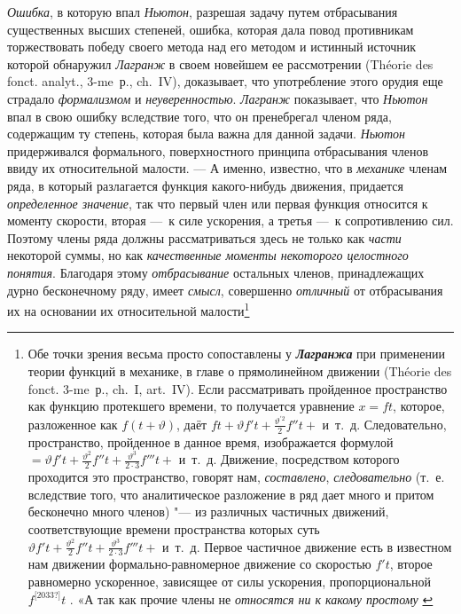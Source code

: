{{\em Ошибка}, в которую впал
{\em Ньютон}, разрешая задачу путем отбрасывания
существенных высших степеней, ошибка, которая дала повод противникам
торжествовать победу своего метода над его методом и истинный источник
которой обнаружил {\em Лагранж} в своем новейшем ее рассмотрении
(Théorie des fonct. analyt., 3-me~р., ch.~IV),
доказывает, что употребление этого орудия еще страдало
{\em формализмом} и {\em неуверенностью}. {\em Лагранж}
показывает, что {\em Ньютон} впал в свою ошибку
вследствие того, что он пренебрегал членом ряда, содержащим ту степень,
которая была важна для данной задачи. {\em Ньютон}
придерживался формального, поверхностного принципа отбрасывания членов
ввиду их относительной малости. — А именно, известно, что в
{\em механике} членам ряда, в который разлагается
функция какого-нибудь движения, придается
{\em определенное значение}, так что первый член или
первая функция относится к моменту скорости, вторая —~к силе ускорения, а
третья —~к сопротивлению сил. Поэтому члены ряда должны рассматриваться
здесь не только как {\em части} некоторой суммы, но как
{\em качественные моменты некоторого целостного
понятия}. Благодаря этому {\em отбрасывание} остальных
членов, принадлежащих дурно бесконечному ряду, имеет
{\em смысл}, совершенно
{\em отличный} от отбрасывания их на основании их
относительной малости\footnote{
Обе точки зрения весьма просто
сопоставлены у {\em\bfseries Лагранжа} при
применении теории функций в механике, в главе о прямолинейном движении
(Théorie des fonct. 3-me~р., ch.~I, art.~IV). Если
рассматривать пройденное пространство как функцию протекшего времени, то
получается уравнение $x=\mathit{ft}$, которое, разложенное
как $f(t+\vartheta )$, даёт
$\mathit{ft} + \vartheta f't + \frac{\vartheta ^{'2}} 2 f''t + $
и~т.~д. Следовательно, пространство, пройденное в данное время,
изображается формулой
$ = \vartheta f't+\frac{\vartheta ^2}
2 f''t + \frac{\vartheta ^3}{2 \cdot 3} f'''t + $
и~т.~д. Движение, посредством которого проходится это
пространство, говорят нам, {\em составлено}, {\em следовательно} (т.~е.
вследствие того, что аналитическое разложение в ряд дает много и притом
бесконечно много членов) "--- из различных частичных движений,
соответствующие времени пространства которых суть
$ \vartheta f't+\frac{\vartheta ^2}
2 f''t + \frac{\vartheta ^3}{2 \cdot 3} f'''t + $
и~т.~д. Первое частичное
движение есть в известном нам движении формально-равномерное движение со
скоростью $f't$, второе равномерно ускоренное, зависящее
от силы ускорения, пропорциональной $f^{\text{[2033?]}}t$ .
«А так как прочие члены не {\em относятся ни к какому простому
}}}
